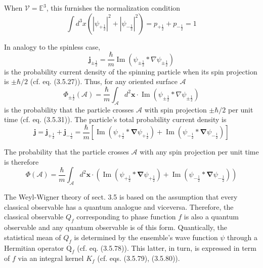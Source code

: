 \documentclass{article}
\begin{document}
When $\mathcal{V}=\mathbb{E}^{3}$, this furnishes the normalization condition
$$
\begin{equation*}
\int d^{3} x\left(\left|\psi_{+\frac{1}{2}}\right|^{2}+\left|\psi_{-\frac{1}{2}}\right|^{2}\right)=p_{+\frac{1}{2}}+p_{-\frac{1}{2}}=1 \tag{3.21.7}
\end{equation*}
$$

In analogy to the spinless case,
$$
\begin{equation*}
\boldsymbol{j}_{ \pm \frac{1}{2}}=\frac{\hbar}{m} \operatorname{Im}\left(\psi_{ \pm \frac{1}{2}} * \nabla \psi_{ \pm \frac{1}{2}}\right) \tag{3.21.8}
\end{equation*}
$$
is the probability current density of the spinning particle when its spin projection is $\pm \hbar / 2$ (cf. eq. (3.5.27)). Thus, for any oriented surface $\mathcal{A}$
$$
\begin{equation*}
\Phi_{ \pm \frac{1}{2}}(\mathcal{A})=\frac{\hbar}{m} \int_{\mathcal{A}} d^{2} \boldsymbol{x} \cdot \operatorname{Im}\left(\psi_{ \pm \frac{1}{2}} * \nabla \psi_{ \pm \frac{1}{2}}\right) \tag{3.21.9}
\end{equation*}
$$
is the probability that the particle crosses $\mathcal{A}$ with spin projection $\pm \hbar / 2$ per unit time (cf. eq. (3.5.31)). The particle's total probability current density is
$$
\begin{equation*}
\boldsymbol{j}=\boldsymbol{j}_{+\frac{1}{2}}+\boldsymbol{j}_{-\frac{1}{2}}=\frac{\hbar}{m}\left[\operatorname{Im}\left(\psi_{+\frac{1}{2}} * \boldsymbol{\nabla} \psi_{+\frac{1}{2}}\right)+\operatorname{Im}\left(\psi_{-\frac{1}{2}} * \boldsymbol{\nabla} \psi_{-\frac{1}{2}}\right)\right] \tag{3.21.10}
\end{equation*}
$$

The probability that the particle crosses $\mathcal{A}$ with any spin projection per unit time is therefore
$$
\begin{equation*}
\Phi(\mathcal{A})=\frac{\hbar}{m} \int_{\mathcal{A}} d^{2} \boldsymbol{x} \cdot\left(\operatorname{Im}\left(\psi_{+\frac{1}{2}} * \boldsymbol{\nabla} \psi_{+\frac{1}{2}}\right)+\operatorname{Im}\left(\psi_{-\frac{1}{2}} * \boldsymbol{\nabla} \psi_{-\frac{1}{2}}\right)\right) \tag{3.21.11}
\end{equation*}
$$

The Weyl-Wigner theory of sect. 3.5 is based on the assumption that every
classical observable has a quantum analogue and viceversa. Therefore, the classical observable $Q_{f}$ corresponding to phase function $f$ is also a quantum observable and any quantum observable is of this form. Quantically, the statistical mean of $Q_{f}$ is determined by the ensemble's wave function $\psi$ through a Hermitian operator $\mathrm{Q}_{f}$ (cf. eq. (3.5.78)). This latter, in turn, is expressed in term of $f$ via an integral kernel $K_{f}$ (cf. eqs. (3.5.79), (3.5.80)).
\end{document}
